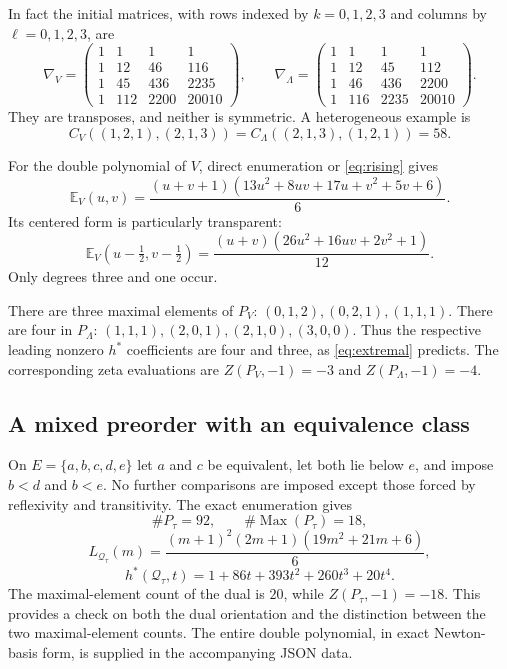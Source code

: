 \documentclass[11pt,letterpaper]{article}
\theoremstyle{definition}
\newcommand{\QQ}{\mathcal Q}
\newcommand{\EE}{\mathbb E}
\DeclareMathOperator{\Max}{Max}
\begin{document}
In fact the initial matrices, with rows indexed by $k=0,1,2,3$ and columns
by $\ell=0,1,2,3$, are
\begin{equation}\label{eq:fork-matrices}
 \nabla_V=
 \begin{pmatrix}
 1&1&1&1\\
 1&12&46&116\\
 1&45&436&2235\\
 1&112&2200&20010
 \end{pmatrix},\qquad
 \nabla_\Lambda=
 \begin{pmatrix}
 1&1&1&1\\
 1&12&45&112\\
 1&46&436&2200\\
 1&116&2235&20010
 \end{pmatrix}.
\end{equation}
They are transposes, and neither is symmetric. A heterogeneous example is
\[
 C_V((1,2,1),(2,1,3))
 =C_\Lambda((2,1,3),(1,2,1))=58.
\]

For the double polynomial of $V$, direct enumeration or
\eqref{eq:rising} gives
\[
 \EE_V(u,v)=\frac{(u+v+1)(13u^2+8uv+17u+v^2+5v+6)}6.
\]
Its centered form is particularly transparent:
\[
 \EE_V(u-\tfrac12,v-\tfrac12)
 =\frac{(u+v)(26u^2+16uv+2v^2+1)}{12}.
\]
Only degrees three and one occur.

There are three maximal elements of $P_V$:
$(0,1,2),(0,2,1),(1,1,1)$. There are four in $P_\Lambda$:
$(1,1,1),(2,0,1),(2,1,0),(3,0,0)$. Thus the respective leading nonzero
$h^*$ coefficients are four and three, as
\eqref{eq:extremal} predicts. The corresponding zeta evaluations are
$Z(P_V,-1)=-3$ and $Z(P_\Lambda,-1)=-4$.

\subsection{A mixed preorder with an equivalence class}
On $E=\{a,b,c,d,e\}$ let $a$ and $c$ be equivalent, let both lie below
$e$, and impose $b<d$ and $b<e$. No further comparisons are imposed except
those forced by reflexivity and transitivity. The exact enumeration gives
\[
 \#P_\tau=92,\qquad \#\Max(P_\tau)=18,
\]
\[
 L_{\QQ_\tau}(m)
 =\frac{(m+1)^2(2m+1)(19m^2+21m+6)}6,
\]
\[
 h^*(\QQ_\tau,t)=1+86t+393t^2+260t^3+20t^4.
\]
The maximal-element count of the dual is $20$, while
$Z(P_\tau,-1)=-18$. This provides a check on both the dual orientation and
the distinction between the two maximal-element counts. The entire double
polynomial, in exact Newton-basis form, is supplied in the accompanying
JSON data.
\end{document}
